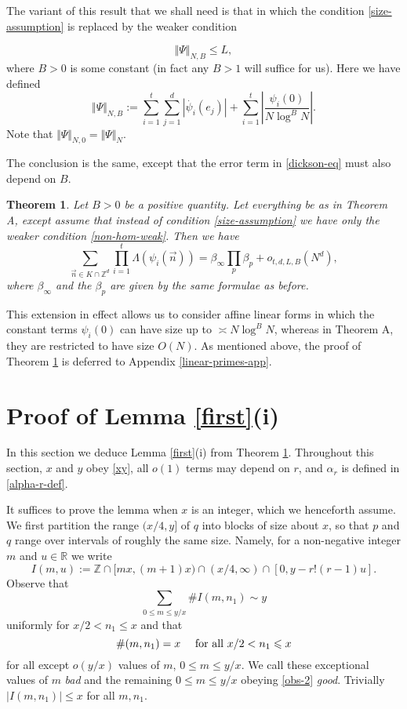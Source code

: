 \documentclass[11pt]{amsart}
\numberwithin{equation}{section}  %
\theoremstyle{remark}
\theoremstyle{plain}
\newtheorem{thm}{Theorem}
\numberwithin{equation}{section}
\newcommand{\Z}{\mathbb{Z}}
\newcommand{\R}{\mathbb{R}}
\renewcommand{\le}{\leqslant}
\renewcommand{\leq}{\leqslant}
\renewcommand{\(}{\left(}
\renewcommand{\)}{\right)}
\newcommand{\asym}{\sim}   %
\newcommand{\vect}[1]{{\ensuremath{\vec{#1}}}}
\begin{document}
The variant of this result that we shall need is that in which the condition \eqref{size-assumption} is replaced by the weaker condition 

\begin{equation}\label{non-hom-weak} \Vert \Psi \Vert_{N,B} \leq L, \end{equation}
where $B > 0$ is some constant (in fact any $B > 1$ will suffice for us). Here we have defined
\[ \Vert \Psi \Vert_{N,B} := \sum_{i=1}^t \sum_{j = 1}^d |\dot{\psi_i}(e_j)|  + \sum_{i = 1}^t \left|\frac{\psi_i(0)}{N\log^B N}\right|.\] Note that $\Vert \Psi \Vert_{N,0} = \Vert \Psi \Vert_N$.

 The conclusion is the same, except that the error term in \eqref{dickson-eq} must also depend on $B$.


\begin{thm}\label{dickson-shifted}
Let $B > 0$ be a positive quantity. Let everything be as in Theorem A, 
except assume that instead of condition \eqref{size-assumption} we have only the weaker condition \eqref{non-hom-weak}. Then we have
\[
\sum_{ \vect{n} \in K \cap \Z^d} \prod_{i=1}^t \Lambda( \psi_i(\vect{n}) ) = \beta_\infty \prod_p \beta_p + o_{t,d,L,B}(N^d),
\]
where $\beta_{\infty}$ and the $\beta_p$ are given by the same formulae as before.
\end{thm}

This extension in effect allows us to consider affine linear forms in
which the constant terms $\psi_i(0)$ can have size up to $\asymp N
\log^B N$, whereas in Theorem A, they are restricted to have size $O(N)$.  As mentioned above, the proof of Theorem \ref{dickson-shifted} is deferred to Appendix \ref{linear-primes-app}.



\section{Proof of Lemma \ref{first}(i)}\label{first-lemma-sec}

In this section we deduce Lemma \ref{first}(i) from Theorem \ref{dickson-shifted}. Throughout this section, $x$ and $y$ obey \eqref{xy}, all $o(1)$ terms may depend on $r$, and $\alpha_r$ is defined in \eqref{alpha-r-def}.

It suffices to prove the lemma when $x$ is an integer,
which we henceforth assume.
We first partition the range $(x/4,y]$ of $q$ into blocks of size about $x$, so that $p$ and
$q$ range over intervals of roughly the same size.
Namely, for a non-negative integer $m$ and $u \in \R$ we write
\[ I(m,u) := \Z \cap [mx, (m+1)x) \cap (x/4 , \infty) \cap [0, y - r!(r-1)u].\] Observe that
\begin{equation}\label{obs-1}
\sum_{0 \leq m \leq y/x} \# I(m,n_1) \asym y
\end{equation}
uniformly for $x/2 < n_1 \le x$ and that
\begin{equation}\label{obs-2} \# (m,n_1)= x \quad \hbox{ for all } x/2<n_1\le x
\end{equation} for all except $o(y/x)$ values of $m$, $0 \leq m \leq y/x$. We call these exceptional values of $m$ \emph{bad} and the remaining $0 \leq m \leq y/x$ obeying \eqref{obs-2} \emph{good}. Trivially $|I(m,n_1)| \leq x$ for all $m,n_1$.
\end{document}
